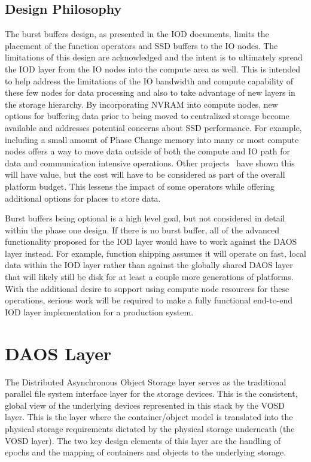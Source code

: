 \documentclass[conference]{IEEEtran} \pdfpagewidth=8.5in
\begin{document}
\subsection{Design Philosophy}

The burst buffers design, as presented in the IOD documents, limits the
placement of the function operators and SSD buffers to the IO nodes. The
limitations of this design are acknowledged and the intent is to ultimately
spread the IOD layer from the IO nodes into the compute area as well.  This is
intended to help address the limitations of the IO bandwidth and compute
capability of these few nodes for data processing and also to take advantage
of new layers in the storage hierarchy. By incorporating NVRAM into compute
nodes, new options for buffering data prior to being moved to centralized
storage become available and addresses potential concerns about SSD
performance. For example, including a small amount of Phase Change memory into
many or most compute nodes offers a way to move data outside of both the
compute and IO path for data and communication intensive operations. Other
projects~\cite{zheng:2010:predata} have shown this will have value, but the
cost will have to be considered as part of the overall platform budget. This
lessens the impact of some operators while offering additional options for
places to store data.

Burst buffers being optional is a high level goal, but not considered in detail
within the phase one design. If there is no burst buffer, all of the advanced
functionality proposed for the IOD layer would have to work against the DAOS
layer instead. For example, function shipping assumes it will operate on fast,
local data within the IOD layer rather than against the globally shared DAOS
layer that will likely still be disk for at least a couple more generations of
platforms. With the additional desire to support using compute node resources
for these operations, serious work will be required to make a fully functional
end-to-end IOD layer implementation for a production system.

\section{DAOS Layer}
\label{sec:daos}

The Distributed Asynchronous Object Storage layer serves as the traditional
parallel file system interface layer for the storage devices. This is the
consistent, global view of the underlying devices represented in this stack
by the VOSD layer.
This is the layer where the container/object model is translated into the
physical storage requirements dictated by the physical storage underneath (the
VOSD layer). The two key design elements of this layer are the handling of
epochs and the mapping of containers and objects to the underlying storage.
\end{document}
